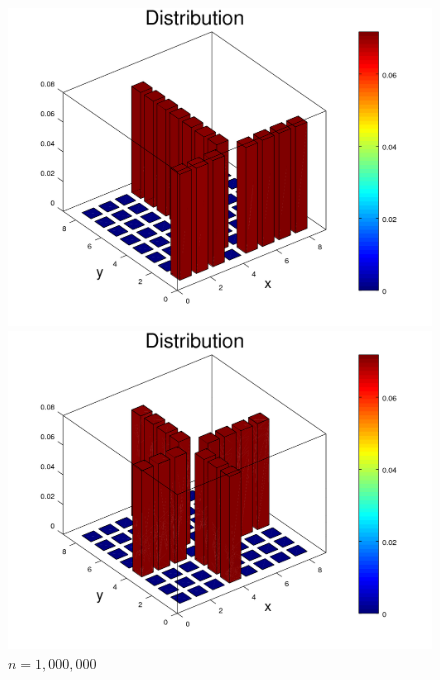 \documentclass{amsart}
\numberwithin{equation}{section}
\begin{document}
\begin{figure}[!h]
\begin{minipage}{0.50\textwidth}
     \centering
     \includegraphics[width=1.0\linewidth]{figures/regular/figure_Rook_moveFixedOrigin_N1000000_x4_y1.png}
     \captionsetup{labelformat=empty}
     \caption*{$n=1,000,000$}
    \end{minipage}\hfil
    \begin{minipage}{0.50\textwidth}
     \centering
     \includegraphics[width=1.0\linewidth]{figures/regular/figure_Rook_moveFixedOrigin_N1000000_x4_y4.png}
     \captionsetup{labelformat=empty}
     \caption*{$n=1,000,000$}
   \end{minipage}\hfill
   \begin{minipage}{0.50\textwidth}
     \centering

\end{minipage}
\end{figure}
\end{document}
